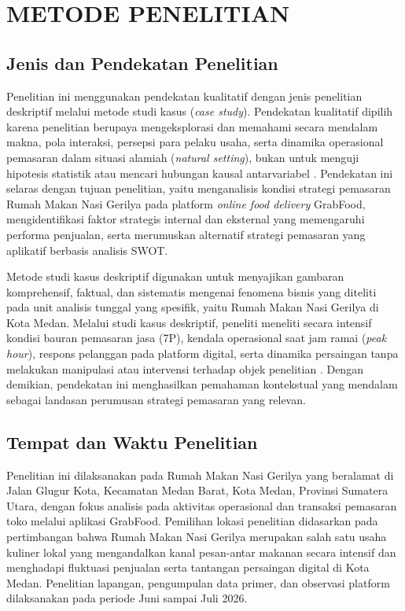 \chapter{METODE PENELITIAN}

\section{Jenis dan Pendekatan Penelitian}
Penelitian ini menggunakan pendekatan kualitatif dengan jenis penelitian deskriptif melalui metode studi kasus (\textit{case study}). Pendekatan kualitatif dipilih karena penelitian berupaya mengeksplorasi dan memahami secara mendalam makna, pola interaksi, persepsi para pelaku usaha, serta dinamika operasional pemasaran dalam situasi alamiah (\textit{natural setting}), bukan untuk menguji hipotesis statistik atau mencari hubungan kausal antarvariabel \parencite{creswell2018qualitativeinquiry,flick2018designingqualitative}. Pendekatan ini selaras dengan tujuan penelitian, yaitu menganalisis kondisi strategi pemasaran Rumah Makan Nasi Gerilya pada platform \textit{online food delivery} GrabFood, mengidentifikasi faktor strategis internal dan eksternal yang memengaruhi performa penjualan, serta merumuskan alternatif strategi pemasaran yang aplikatif berbasis analisis SWOT.

Metode studi kasus deskriptif digunakan untuk menyajikan gambaran komprehensif, faktual, dan sistematis mengenai fenomena bisnis yang diteliti pada unit analisis tunggal yang spesifik, yaitu Rumah Makan Nasi Gerilya di Kota Medan. Melalui studi kasus deskriptif, peneliti meneliti secara intensif kondisi bauran pemasaran jasa (7P), kendala operasional saat jam ramai (\textit{peak hour}), respons pelanggan pada platform digital, serta dinamika persaingan tanpa melakukan manipulasi atau intervensi terhadap objek penelitian \parencite{patton2015qualitativeevaluation,miles2020qualitativedata}. Dengan demikian, pendekatan ini menghasilkan pemahaman kontekstual yang mendalam sebagai landasan perumusan strategi pemasaran yang relevan.

\section{Tempat dan Waktu Penelitian}
Penelitian ini dilaksanakan pada Rumah Makan Nasi Gerilya yang beralamat di Jalan Glugur Kota, Kecamatan Medan Barat, Kota Medan, Provinsi Sumatera Utara, dengan fokus analisis pada aktivitas operasional dan transaksi pemasaran toko melalui aplikasi GrabFood. Pemilihan lokasi penelitian didasarkan pada pertimbangan bahwa Rumah Makan Nasi Gerilya merupakan salah satu usaha kuliner lokal yang mengandalkan kanal pesan-antar makanan secara intensif dan menghadapi fluktuasi penjualan serta tantangan persaingan digital di Kota Medan. Penelitian lapangan, pengumpulan data primer, dan observasi platform dilaksanakan pada periode Juni sampai Juli 2026.


